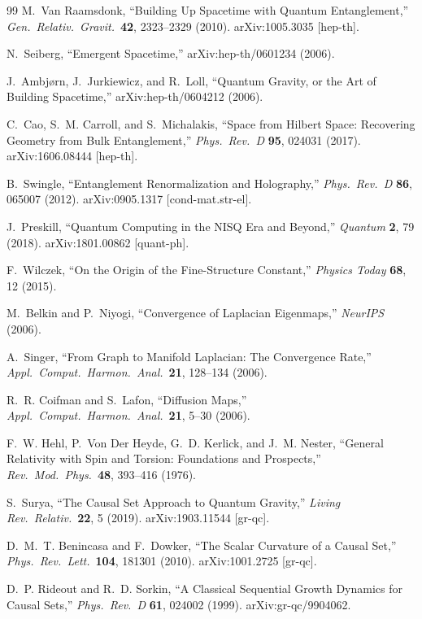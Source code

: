 \documentclass[11pt,a4paper]{article}
\theoremstyle{plain}
\theoremstyle{definition}
\begin{document}
\begin{thebibliography}{99}
M.~Van Raamsdonk, ``Building Up Spacetime with Quantum Entanglement,'' \textit{Gen.\ Relativ.\ Gravit.}\ \textbf{42}, 2323--2329 (2010). arXiv:1005.3035 [hep-th].

N.~Seiberg, ``Emergent Spacetime,'' arXiv:hep-th/0601234 (2006).

J.~Ambj\o rn, J.~Jurkiewicz, and R.~Loll, ``Quantum Gravity, or the Art of Building Spacetime,'' arXiv:hep-th/0604212 (2006).

C.~Cao, S.~M. Carroll, and S.~Michalakis, ``Space from Hilbert Space: Recovering Geometry from Bulk Entanglement,'' \textit{Phys.\ Rev.\ D} \textbf{95}, 024031 (2017). arXiv:1606.08444 [hep-th].

B.~Swingle, ``Entanglement Renormalization and Holography,'' \textit{Phys.\ Rev.\ D} \textbf{86}, 065007 (2012). arXiv:0905.1317 [cond-mat.str-el].

J.~Preskill, ``Quantum Computing in the NISQ Era and Beyond,'' \textit{Quantum} \textbf{2}, 79 (2018). arXiv:1801.00862 [quant-ph].

F.~Wilczek, ``On the Origin of the Fine-Structure Constant,'' \textit{Physics Today} \textbf{68}, 12 (2015).

M.~Belkin and P.~Niyogi, ``Convergence of Laplacian Eigenmaps,'' \textit{NeurIPS} (2006).

A.~Singer, ``From Graph to Manifold Laplacian: The Convergence Rate,'' \textit{Appl.\ Comput.\ Harmon.\ Anal.}\ \textbf{21}, 128--134 (2006).

R.~R. Coifman and S.~Lafon, ``Diffusion Maps,'' \textit{Appl.\ Comput.\ Harmon.\ Anal.}\ \textbf{21}, 5--30 (2006).

F.~W. Hehl, P.~Von Der Heyde, G.~D. Kerlick, and J.~M. Nester, ``General Relativity with Spin and Torsion: Foundations and Prospects,'' \textit{Rev.\ Mod.\ Phys.}\ \textbf{48}, 393--416 (1976).

S.~Surya, ``The Causal Set Approach to Quantum Gravity,'' \textit{Living Rev.\ Relativ.}\ \textbf{22}, 5 (2019). arXiv:1903.11544 [gr-qc].

D.~M.~T. Benincasa and F.~Dowker, ``The Scalar Curvature of a Causal Set,'' \textit{Phys.\ Rev.\ Lett.}\ \textbf{104}, 181301 (2010). arXiv:1001.2725 [gr-qc].

D.~P. Rideout and R.~D. Sorkin, ``A Classical Sequential Growth Dynamics for Causal Sets,'' \textit{Phys.\ Rev.\ D} \textbf{61}, 024002 (1999). arXiv:gr-qc/9904062.


\end{thebibliography}
\end{document}
